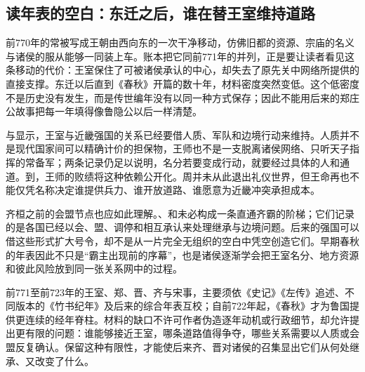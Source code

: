 \subsection{读年表的空白：东迁之后，谁在替王室维持道路}

前770年的常被写成王朝由西向东的一次干净移动，仿佛旧都的资源、宗庙的名义与诸侯的服从能够一同装上车。账本把它同前771年的并列，正是要让读者看见这条移动的代价：王室保住了可被诸侯承认的中心，却失去了原先关中网络所提供的直接支撑。东迁以后直到《春秋》开篇的数十年，材料密度突然变低。这个低密度不是历史没有发生，而是传世编年没有以同一种方式保存；因此不能用后来的郑庄公故事把每一年填得像鲁隐公以后一样清楚。

与显示，王室与近畿强国的关系已经要借人质、军队和边境行动来维持。人质并不是现代国家间可以精确计价的担保物，王师也不是一支脱离诸侯网络、只听天子指挥的常备军；两条记录仍足以说明，名分若要变成行动，就要经过具体的人和通道。到，王师的败绩将这种依赖公开化。周并未从此退出礼仪世界，但王命再也不能仅凭名称决定谁提供兵力、谁开放道路、谁愿意为近畿冲突承担成本。

齐桓之前的会盟节点也应如此理解。、和未必构成一条直通齐霸的阶梯；它们记录的是各国已经以会、盟、调停和相互承认来处理继承与边境问题。后来的强国可以借这些形式扩大号令，却不是从一片完全无组织的空白中凭空创造它们。早期春秋的年表因此不只是“霸主出现前的序幕”，也是诸侯逐渐学会把王室名分、地方资源和彼此风险放到同一张关系网中的过程。

\begin{sourcenote}[早期年表为何必须留下空白]
前771至前723年的王室、郑、晋、齐与宋事，主要须依《史记》《左传》追述、不同版本的《竹书纪年》及后来的综合年表互校；自前722年起，《春秋》才为鲁国提供更连续的经年脊柱。材料的缺口不许可作者伪造逐年动机或行政细节，却允许提出更有限的问题：谁能够接近王室，哪条道路值得争夺，哪些关系需要以人质或会盟反复确认。保留这种有限性，才能使后来齐、晋对诸侯的召集显出它们从何处继承、又改变了什么。
\end{sourcenote}
